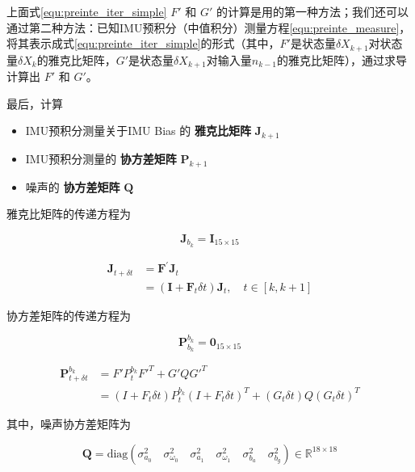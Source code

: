 \documentclass[12pt,a4paper]{article}
\begin{document}
上面式\eqref{equ:preinte_iter_simple} $F'$ 和 $G'$ 的计算是用的第一种方法；我们还可以通过第二种方法：已知IMU预积分（中值积分）测量方程\eqref{equ:preinte_measure}，将其表示成式\eqref{equ:preinte_iter_simple}的形式（其中，$F'$是状态量$\delta X_{k+1}$对状态量$\delta X_k$的雅克比矩阵，$G'$是状态量$\delta X_{k+1}$对输入量$n_{k-1}$的雅克比矩阵），通过求导计算出 $F'$ 和 $G'$。

最后，计算

\begin{itemize}[itemindent=1em]
  \item IMU预积分测量关于IMU Bias 的 \textbf{雅克比矩阵} $\mathbf{J}_{k+1}$
  \item IMU预积分测量的 \textbf{协方差矩阵} $\mathbf{P}_{k+1}$
  \item 噪声的 \textbf{协方差矩阵} $\mathbf{Q}$
\end{itemize}

雅克比矩阵的传递方程为

\begin{equation}
\mathbf{J}_{b_k} = \mathbf{I}_{15 \times 15}
\end{equation}

\begin{equation}
\begin{aligned}
\mathbf{J}_{t+\delta t} 
&= 
\mathbf{F^{\prime}} \mathbf{J}_t \\
&= 
(\mathbf{I} + \mathbf{F}_t \delta t) \mathbf{J}_t, \quad t \in [k, k+1]
\end{aligned}
\end{equation}

协方差矩阵的传递方程为

\begin{equation}
\mathbf{P}_{b_{k}}^{b_k} = \mathbf{0}_{15 \times 15}
\end{equation}

\begin{equation}
\begin{aligned}
\mathbf{P}_{t+\delta t}^{b_k} 
&= 
F' P_t^{b_k} F'^T + G' Q {G'}^T \\
&= 
(I + F_t \delta t)P_{t}^{b_k}(I + F_t \delta t)^T + (G_t \delta t)Q(G_t \delta t)^T
\end{aligned}
\end{equation}

其中，噪声协方差矩阵为

\begin{equation}
\mathbf{Q} = 
\text{diag}(
  \sigma_{a_0}^2 \quad \sigma_{\omega_0}^2 \quad
  \sigma_{a_1}^2 \quad \sigma_{\omega_1}^2 \quad
  \sigma_{b_a}^2 \quad \sigma_{b_g}^2) 
\in \mathbb{R}^{18 \times 18}
\end{equation}
\end{document}

